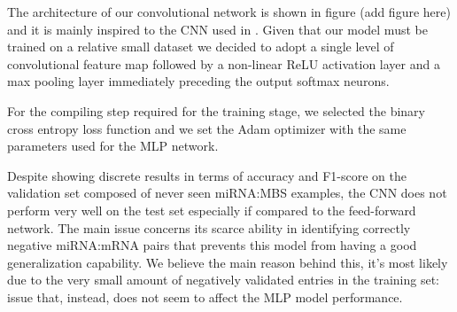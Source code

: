 The architecture of our convolutional network is shown in figure (add figure here) and it is mainly inspired to the CNN used in \cite{cnn_arch}. Given that our model must be trained on a relative small dataset we decided to adopt a single level of convolutional feature map followed by a non-linear ReLU activation layer and a max pooling layer immediately preceding the output softmax neurons. 


For the compiling step required for the training stage, we selected the binary cross entropy loss function and we set the Adam optimizer with the same parameters used for the MLP network.

Despite showing discrete results in terms of accuracy and F1-score on the validation set composed of never seen miRNA:MBS examples, the CNN does not perform very well on the test set especially if compared to the feed-forward network. The main issue
concerns its scarce ability in identifying correctly negative miRNA:mRNA pairs that prevents this model from having a good generalization capability. We believe the main reason behind this, it's most likely due to the very small amount of negatively validated entries in the training set: issue that, instead, does not seem to affect the MLP model performance.

  


